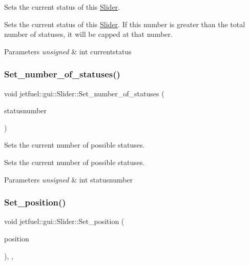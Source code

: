 Sets the current status of this \hyperlink{classjetfuel_1_1gui_1_1Slider}{Slider}. 

Sets the current status of this \hyperlink{classjetfuel_1_1gui_1_1Slider}{Slider}. If this number is greater than the total number of statuses, it will be capped at that number.


\begin{DoxyParams}{Parameters}
{\em unsigned} & int currentstatus \\
\hline
\end{DoxyParams}
\mbox{\label{classjetfuel_1_1gui_1_1Slider_abf6238d5bd9c33e2a22f5e901b62801d}} 
\subsubsection{\texorpdfstring{Set\+\_\+number\+\_\+of\+\_\+statuses()}{Set\_number\_of\_statuses()}}
{\footnotesize\ttfamily void jetfuel\+::gui\+::\+Slider\+::\+Set\+\_\+number\+\_\+of\+\_\+statuses (\begin{DoxyParamCaption}\item[{const unsigned int}]{statusnumber }\end{DoxyParamCaption})\hspace{0.3cm}{\ttfamily [inline]}}



Sets the current number of possible statuses. 

Sets the current number of possible statuses.


\begin{DoxyParams}{Parameters}
{\em unsigned} & int statusnumber \\
\hline
\end{DoxyParams}
\mbox{\label{classjetfuel_1_1gui_1_1Slider_a11721a72699e9d1cdd0f6e5709f003e4}} 
\subsubsection{\texorpdfstring{Set\+\_\+position()}{Set\_position()}}
{\footnotesize\ttfamily void jetfuel\+::gui\+::\+Slider\+::\+Set\+\_\+position (\begin{DoxyParamCaption}\item[{\hyperlink{classjetfuel_1_1draw_1_1Vector2d}{jetfuel\+::draw\+::\+Vector2d\+\_\+int}}]{position }\end{DoxyParamCaption})\hspace{0.3cm}{\ttfamily [inline]}, {\ttfamily [override]}, {\ttfamily [virtual]}}



